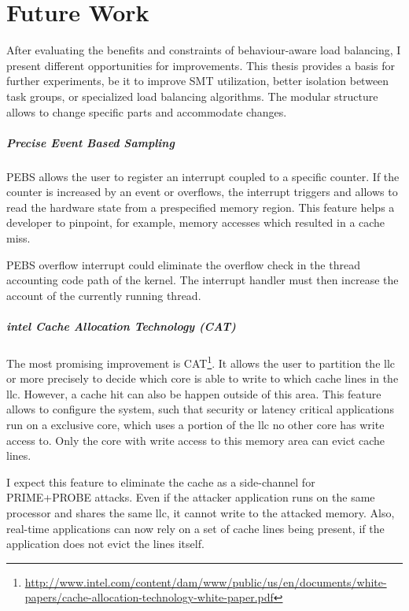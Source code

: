 \chapter{Future Work}
\label{sec:futurework}


After evaluating the benefits and constraints of behaviour-aware load
balancing, I present different opportunities for improvements.
This thesis provides a basis for further experiments, be it to improve SMT
utilization, better isolation between task groups, or specialized load
balancing algorithms.
The modular structure allows to change specific parts and accommodate changes.

\paragraph{Precise Event Based Sampling}
PEBS allows the user to register an interrupt coupled to a specific counter.
If the counter is increased by an event or overflows, the interrupt triggers
and allows to read the hardware state from a prespecified memory region.
This feature helps a developer to pinpoint, for example, memory accesses which
resulted in a cache miss.

PEBS overflow interrupt could eliminate the overflow check in the thread
accounting code path of the kernel.
The interrupt handler must then increase the account of the currently running
thread.

\paragraph{\gls{intel} Cache Allocation Technology (CAT)}
The most promising improvement is CAT\footnote{
  \url{http://www.intel.com/content/dam/www/public/us/en/documents/white-papers/cache-allocation-technology-white-paper.pdf}}.
It allows the user to partition the \gls{llc} or more precisely to decide
which core is able to write to which cache lines in the \gls{llc}.
However, a cache hit can also be happen outside of this area.
This feature allows to configure the system, such that security or latency
critical applications run on a exclusive core, which uses a portion of the
\gls{llc} no other core has write access to.
Only the core with write access to this memory area can evict cache lines.

I expect this feature to eliminate the cache as a side-channel for PRIME+PROBE
attacks.
Even if the attacker application runs on the same processor and shares the same
\gls{llc}, it cannot write to the attacked memory.
Also, real-time applications can now rely on a set of cache lines being
present, if the application does not evict the lines itself.

